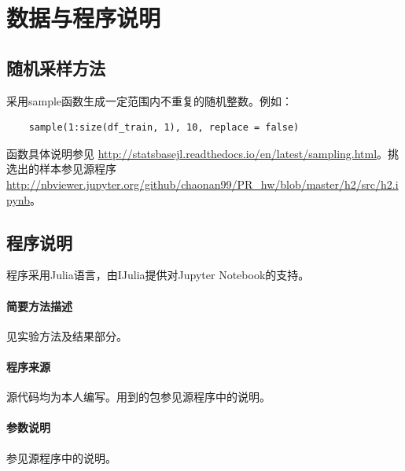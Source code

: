 \section{数据与程序说明}
\subsection{随机采样方法}
采用{\ttfamily sample}函数生成一定范围内不重复的随机整数。例如：
\begin{lstlisting}
	sample(1:size(df_train, 1), 10, replace = false)
\end{lstlisting}
函数具体说明参见 \url{http://statsbasejl.readthedocs.io/en/latest/sampling.html}。挑选出的样本参见源程序 \url{http://nbviewer.jupyter.org/github/chaonan99/PR_hw/blob/master/h2/src/h2.ipynb}。

\subsection{程序说明}
程序采用{\ttfamily Julia}语言，由{\ttfamily IJulia}提供对{\ttfamily Jupyter Notebook}的支持。
\paragraph{简要方法描述} 见实验方法及结果部分。
\paragraph{程序来源} 源代码均为本人编写。用到的包参见源程序中的说明。
\paragraph{参数说明} 参见源程序中的说明。


